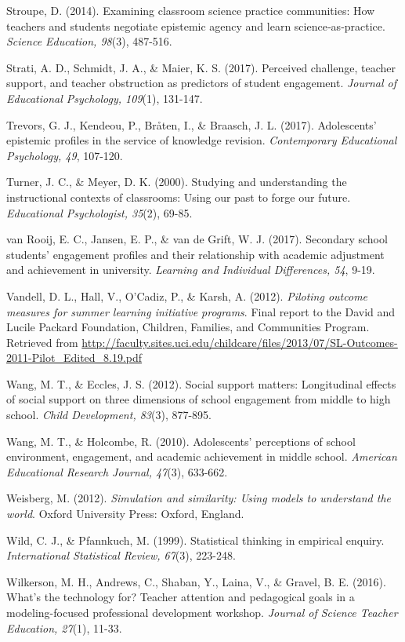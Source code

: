 \documentclass[]{book}
\theoremstyle{definition}
\theoremstyle{definition}
\theoremstyle{definition}
\theoremstyle{remark}
\begin{document}
Stroupe, D. (2014). Examining classroom science practice communities:
How teachers and students negotiate epistemic agency and learn
science‐as‐practice. \emph{Science Education, 98}(3), 487-516.

Strati, A. D., Schmidt, J. A., \& Maier, K. S. (2017). Perceived
challenge, teacher support, and teacher obstruction as predictors of
student engagement. \emph{Journal of Educational Psychology, 109}(1),
131-147.

Trevors, G. J., Kendeou, P., Bråten, I., \& Braasch, J. L. (2017).
Adolescents' epistemic profiles in the service of knowledge revision.
\emph{Contemporary Educational Psychology, 49}, 107-120.

Turner, J. C., \& Meyer, D. K. (2000). Studying and understanding the
instructional contexts of classrooms: Using our past to forge our
future. \emph{Educational Psychologist, 35}(2), 69-85.

van Rooij, E. C., Jansen, E. P., \& van de Grift, W. J. (2017).
Secondary school students' engagement profiles and their relationship
with academic adjustment and achievement in university. \emph{Learning
and Individual Differences, 54}, 9-19.

Vandell, D. L., Hall, V., O'Cadiz, P., \& Karsh, A. (2012).
\emph{Piloting outcome measures for summer learning initiative
programs}. Final report to the David and Lucile Packard Foundation,
Children, Families, and Communities Program. Retrieved from
\url{http://faculty.sites.uci.edu/childcare/files/2013/07/SL-Outcomes-2011-Pilot_Edited_8.19.pdf}

Wang, M. T., \& Eccles, J. S. (2012). Social support matters:
Longitudinal effects of social support on three dimensions of school
engagement from middle to high school. \emph{Child Development, 83}(3),
877-895.

Wang, M. T., \& Holcombe, R. (2010). Adolescents' perceptions of school
environment, engagement, and academic achievement in middle school.
\emph{American Educational Research Journal, 47}(3), 633-662.

Weisberg, M. (2012). \emph{Simulation and similarity: Using models to
understand the world}. Oxford University Press: Oxford, England.

Wild, C. J., \& Pfannkuch, M. (1999). Statistical thinking in empirical
enquiry. \emph{International Statistical Review, 67}(3), 223-248.

Wilkerson, M. H., Andrews, C., Shaban, Y., Laina, V., \& Gravel, B. E.
(2016). What's the technology for? Teacher attention and pedagogical
goals in a modeling-focused professional development workshop.
\emph{Journal of Science Teacher Education, 27}(1), 11-33.
\end{document}
